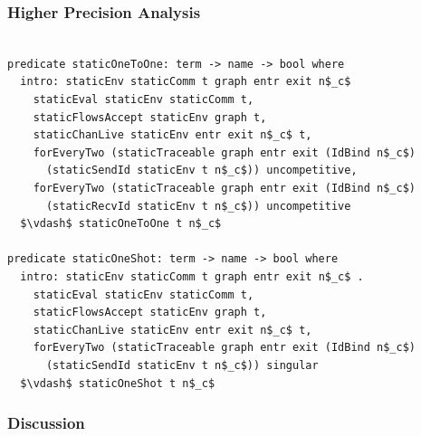\documentclass{beamer}
\begin{document}
\begin{frame}[fragile]
	\frametitle{Higher Precision Analysis}
\begin{lstlisting}[language=logic, mathescape]

predicate staticOneToOne: term -> name -> bool where
  intro: staticEnv staticComm t graph entr exit n$_c$ 
    staticEval staticEnv staticComm t,
    staticFlowsAccept staticEnv graph t,
    staticChanLive staticEnv entr exit n$_c$ t, 
    forEveryTwo (staticTraceable graph entr exit (IdBind n$_c$) 
      (staticSendId staticEnv t n$_c$)) uncompetitive, 
    forEveryTwo (staticTraceable graph entr exit (IdBind n$_c$)
      (staticRecvId staticEnv t n$_c$)) uncompetitive
  $\vdash$ staticOneToOne t n$_c$

predicate staticOneShot: term -> name -> bool where
  intro: staticEnv staticComm t graph entr exit n$_c$ . 
    staticEval staticEnv staticComm t,
    staticFlowsAccept staticEnv graph t,
    staticChanLive staticEnv entr exit n$_c$ t, 
    forEveryTwo (staticTraceable graph entr exit (IdBind n$_c$)
      (staticSendId staticEnv t n$_c$)) singular
  $\vdash$ staticOneShot t n$_c$
\end{lstlisting}
\end{frame}

\begin{frame}[fragile]
\frametitle{Discussion}
\end{frame}
\end{document}
